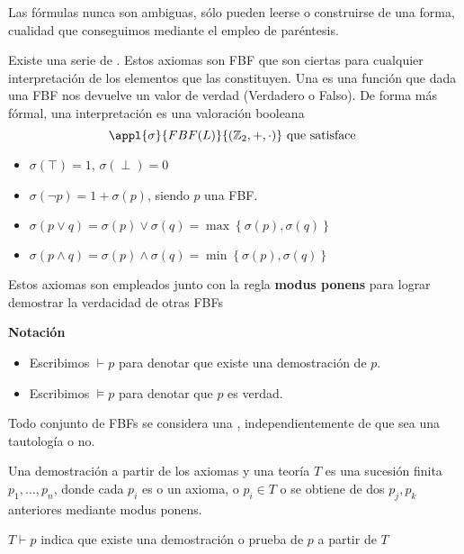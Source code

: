 \documentclass{apuntes}
\begin{document}
\begin{lemma}
Las fórmulas nunca son ambiguas, sólo pueden leerse o construirse de una forma, cualidad que conseguimos mediante el empleo de paréntesis.
\end{lemma}

Existe una serie de . Estos axiomas son FBF que son ciertas para cualquier interpretación de los elementos que las constituyen. Una  es una función que dada una FBF nos devuelve un valor de verdad (Verdadero o Falso). De forma más fórmal, una interpretación es una valoración booleana 
\[\appl{\sigma}{FBF(L)}{(\mathbb{Z}_2, +, \cdot)} \text{ que satisface } \]

\begin{itemize}
	\item $\sigma(\top) = 1$, $\sigma(\perp) = 0$
	\item $\sigma(\neg p) = 1+\sigma(p)$,  siendo $p$ una FBF.
	\item $\sigma (p\vee q) = \sigma(p) \vee \sigma (q) = \max\left\{\sigma(p), \sigma(q)\right\}$
	\item $\sigma (p\wedge q) = \sigma(p) \wedge \sigma (q) = \min\left\{\sigma(p), \sigma(q)\right\}$
\end{itemize}

Estos axiomas son empleados junto con la regla \textbf{modus ponens} para lograr demostrar la verdacidad de otras FBFs

\begin{mdframed}
\textbf{Notación}
\begin{itemize}
	\vspace{-3mm}
	\item Escribimos $\vdash p$ para denotar que existe una demostración de $p$.
	\item Escribimos $\vDash p$ para denotar que $p$ es verdad.
\end{itemize}
\end{mdframed}

Todo conjunto de FBFs se considera una , independientemente de que sea una tautología o no.

\begin{defn}
	Una demostración a partir de los axiomas y una teoría $T$ es una sucesión finita $p_1, \hdots, p_n$, donde cada $p_i$ es o un axioma, o $p_i\in T$ o se obtiene de dos $p_j,p_k$ anteriores mediante modus ponens.

	$T \vdash p$ indica que existe una demostración o prueba de $p$ a partir de $T$
\end{defn}
\end{document}
